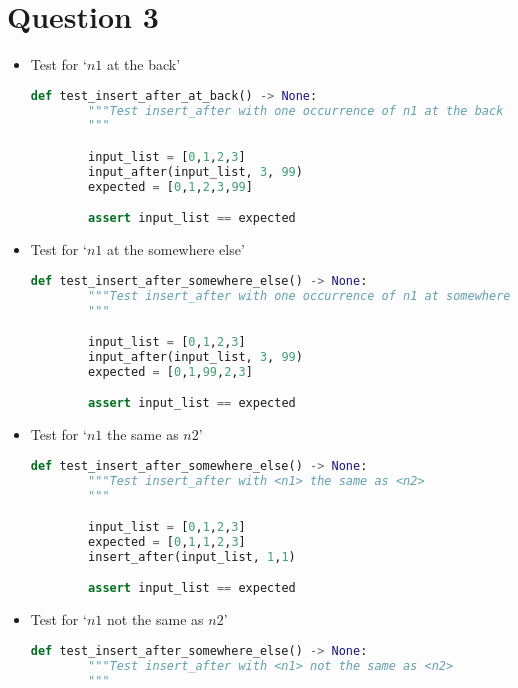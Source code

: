 \documentclass[12pt]{article}
\begin{document}
\section*{Question 3}
\begin{itemize}
    \item

    Test for `$n1$ at the back'

    \begin{lstlisting}[language=Python]
    def test_insert_after_at_back() -> None:
        """Test insert_after with one occurrence of n1 at the back of lst.
        """

        input_list = [0,1,2,3]
        input_after(input_list, 3, 99)
        expected = [0,1,2,3,99]

        assert input_list == expected
    \end{lstlisting}

    \item

    Test for `$n1$ at the somewhere else'

    \begin{lstlisting}[language=Python]
    def test_insert_after_somewhere_else() -> None:
        """Test insert_after with one occurrence of n1 at somewhere else in lst.
        """

        input_list = [0,1,2,3]
        input_after(input_list, 3, 99)
        expected = [0,1,99,2,3]

        assert input_list == expected
    \end{lstlisting}

    \item

    Test for `$n1$ the same as $n2$'

    \begin{lstlisting}[language=Python]
    def test_insert_after_somewhere_else() -> None:
        """Test insert_after with <n1> the same as <n2>
        """

        input_list = [0,1,2,3]
        expected = [0,1,1,2,3]
        insert_after(input_list, 1,1)

        assert input_list == expected
    \end{lstlisting}

    \item

    Test for `$n1$ not the same as $n2$'

    \begin{lstlisting}[language=Python]
    def test_insert_after_somewhere_else() -> None:
        """Test insert_after with <n1> not the same as <n2>
        """


\end{lstlisting}
\end{itemize}
\end{document}
